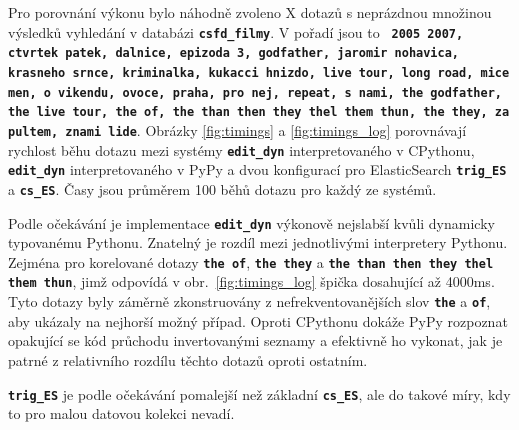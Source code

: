 \documentclass[11pt,letterpaper,oneside,openright]{book}
\newcommand{\bftt}[1]{\texttt{\textbf{#1}}}
\begin{document}
Pro porovnání výkonu bylo náhodně zvoleno X dotazů s neprázdnou množinou
výsledků vyhledání v databázi \bftt{csfd\_filmy}. V pořadí jsou to \bftt{ 2005
2007, ctvrtek patek, dalnice, epizoda 3, godfather, jaromir nohavica, krasneho
srnce, kriminalka, kukacci hnizdo, live tour, long road, mice men, o vikendu,
ovoce, praha, pro nej, repeat, s nami, the godfather, the live tour, the of,
the than then they thel them thun, the they, za pultem, znami lide}. Obrázky
\ref{fig:timings} a \ref{fig:timings_log} porovnávají rychlost běhu dotazu
mezi systémy \bftt{edit\_dyn} interpretovaného v CPythonu, \bftt{edit\_dyn}
interpretovaného v PyPy a dvou konfigurací pro ElasticSearch \bftt{trig\_ES} a
\bftt{cs\_ES}. Časy jsou průměrem 100 běhů dotazu pro každý ze systémů.

Podle očekávání je implementace \bftt{edit\_dyn} výkonově nejslabší kvůli
dynamicky typovanému Pythonu. Znatelný je rozdíl mezi jednotlivými interpretery
Pythonu. Zejména pro korelované dotazy \bftt{the of}, \bftt{the they} a
\bftt{the than then they thel them thun}, jimž odpovídá v
obr.~\ref{fig:timings_log} špička dosahující až 4000ms. Tyto dotazy byly
záměrně zkonstruovány z nefrekventovanějších slov \bftt{the} a \bftt{of}, aby
ukázaly na nejhorší možný případ. Oproti CPythonu dokáže PyPy rozpoznat
opakující se kód průchodu invertovanými seznamy a efektivně ho vykonat, jak je
patrné z relativního rozdílu těchto dotazů oproti ostatním. 

\bftt{trig\_ES} je podle očekávání pomalejší než základní \bftt{cs\_ES}, ale do
takové míry, kdy to pro malou datovou kolekci nevadí.
\end{document}
